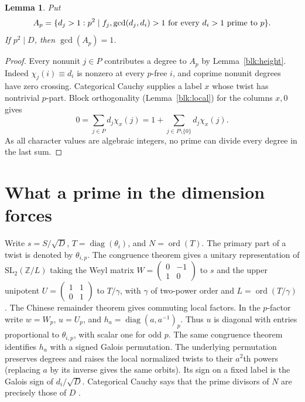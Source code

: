 \documentclass[11pt]{amsart}
\numberwithin{equation}{section}
\newtheorem{lemma}[theorem]{Lemma}
\begin{document}
\begin{lemma}\label{blk:witness}
Put
\[
 A_p=\{d_j>1:p^2\mid f_j,\space
             \gcd(d_j,d_i)>1\text{ for every }d_i>1\text{ prime to }p\}.
\]
If $p^2\mid D$, then $\gcd(A_p)=1$.
\end{lemma}
\begin{proof}
Every nonunit $j\in P$ contributes a degree to $A_p$ by Lemma~\ref{blk:height}. Indeed $\chi_j(i)\equiv d_i$ is nonzero at every $p$-free $i$, and coprime nonunit degrees have zero crossing. Categorical Cauchy supplies a label $x$ whose twist has nontrivial $p$-part. Block orthogonality (Lemma~\ref{blk:local}) for the columns $x,0$ gives
\[
 0=\sum_{j\in P} d_j\chi_x(j)
   =1+\sum_{j\in P\setminus\{0\}}d_j\chi_x(j).
\]
As all character values are algebraic integers, no prime can divide every degree in the last sum.
\end{proof}

\section{What a prime in the dimension forces}\label{blk:section}
Write $s=S/\sqrt D$, $T=\operatorname{diag}(\theta_i)$, and $N=\operatorname{ord}(T)$. The primary part of a twist is denoted by $\theta_{i,p}$. The congruence theorem gives a unitary representation of $\mathrm{SL}_2(\mathbb Z/L)$ taking the Weyl matrix $W=\left(\begin{smallmatrix}0&-1\\1&0\end{smallmatrix}\right)$ to $s$ and the upper unipotent $U=\left(\begin{smallmatrix}1&1\\0&1\end{smallmatrix}\right)$ to $T/\gamma$, with $\gamma$ of two-power order and $L=\operatorname{ord}(T/\gamma)$ \cite[Theorems II and 6.10]{DLNCongruence}. The Chinese remainder theorem gives commuting local factors. In the $p$-factor write $w=W_p$, $u=U_p$, and $h_a=\operatorname{diag}(a,a^{-1})_p$. Thus $u$ is diagonal with entries proportional to $\theta_{i,p}$, with scalar one for odd $p$. The same congruence theorem identifies $h_a$ with a signed Galois permutation. The underlying permutation preserves degrees and raises the local normalized twists to their $a^2$th powers (replacing $a$ by its inverse gives the same orbits). Its sign on a fixed label is the Galois sign of $d_i/\sqrt D$. Categorical Cauchy says that the prime divisors of $N$ are precisely those of $D$ \cite[Theorem~3.9]{BNRWFinite}.
\end{document}
